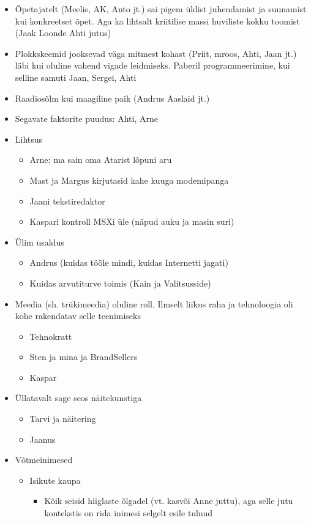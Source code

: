 \documentclass{tufte-book}
\begin{document}
\begin{itemize}
	\item Õpetajatelt (Meelis, AK, Anto jt.) sai pigem üldist juhendamist ja suunamist kui konkreetset õpet. Aga ka lihtsalt kriitilise massi huviliste kokku toomist (Jaak Loonde Ahti jutus)
	\item Plokkskeemid jooksevad väga mitmest kohast (Priit, mroos, Ahti, Jaan jt.) läbi kui oluline vahend vigade leidmiseks. Paberil programmeerimine, kui selline samuti Jaan, Sergei, Ahti
	\item Raadiosõlm kui maagiline paik (Andrus Aaslaid jt.)
	\item Segavate faktorite puudus: Ahti, Arne
	\item Lihtsus
	\begin{itemize}
		\item Arne: ma sain oma Atarist lõpuni aru
		\item Mast ja Margus kirjutasid kahe kuuga modemipanga
		\item Jaani tekstiredaktor
		\item Kaspari kontroll MSXi üle (näpud auku ja masin suri)
	\end{itemize}
	\item Ülim usaldus
	\begin{itemize}
		\item Andrus (kuidas tööle mindi, kuidas Internetti jagati)
		\item Kuidas arvutiturve toimis (Kain ja Valitsusside)
	\end{itemize}
	\item Meedia (sh. trükimeedia) oluline roll. Ilmselt liikus raha ja tehnoloogia oli kohe rakendatav selle teenimiseks
	\begin{itemize}
		\item Tehnokratt
		\item Sten ja mina ja BrandSellers
		\item Kaspar
	\end{itemize}
	\item Üllatavalt sage seos näitekunstiga
	\begin{itemize}
		\item Tarvi ja näitering
		\item Jaanus
	\end{itemize}
	\item Võtmeinimesed
	\begin{itemize}
		\item Isikute kaupa
			\begin{itemize}
				\item Kõik seisid hiiglaste õlgadel (vt. kasvõi Anne juttu), aga selle jutu kontekstis on rida inimesi selgelt esile tulnud

\end{itemize}
\end{itemize}
\end{itemize}
\end{document}
